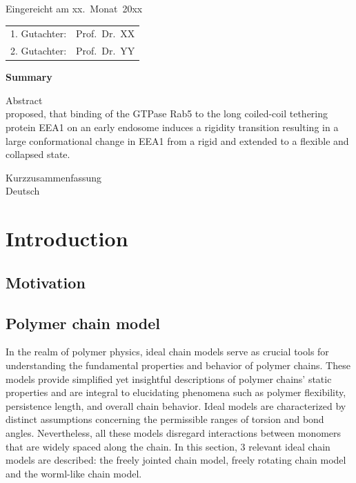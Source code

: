 \documentclass[
    paper=A4,pagesize=automedia,fontsize=12pt,
    BCOR=15mm,DIV=22,
    twoside,headinclude,footinclude=false,
    ngerman,fleqn,             %
    bibliography=totocnumbered,          %
    listof=totoc,                %
    listof=flat,                 %
    cleardoublepage=empty      %
    numbers=endperiod
]{scrartcl}
\begin{document}
\thispagestyle{empty}\vspace*{48em}

Eingereicht am xx.~Monat~20xx\vspace{1.5em}
\par{\large\begin{tabular}{ll}
        1. Gutachter: & Prof.~Dr.~XX \\
        2. Gutachter: & Prof.~Dr.~YY \\
    \end{tabular}}


\newpage
\begin{center}\large\bfseries Summary\end{center}


Abstract \\
\cite{Singh:2022} proposed, that binding of the GTPase Rab5 to the
long coiled-coil tethering protein EEA1 on an early endosome
induces a rigidity transition resulting in a large conformational
change in EEA1 from a rigid and extended to a flexible and collapsed state.


\vspace{20em}
Kurzzusammenfassung \\
Deutsch \\



\cleardoublepage

\thispagestyle{empty}
\tableofcontents

\cleardoublepage



\section{Introduction}
\subsection{Motivation}
\subsection{Polymer chain model}

In the realm of polymer physics, ideal chain models serve as crucial tools
for understanding the fundamental properties and behavior of polymer chains. 
These models provide simplified yet insightful descriptions of polymer chains' 
static properties and are integral to elucidating phenomena such as
polymer flexibility, persistence length, and overall chain behavior.
Ideal models are characterized by distinct assumptions concerning the 
permissible ranges of torsion and bond angles. Nevertheless, all 
these models disregard interactions between monomers that are widely 
spaced along the chain.
In this section, 3 relevant ideal chain models are described: 
the freely jointed chain model, freely rotating chain model and the worml-like chain model.
\end{document}

